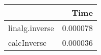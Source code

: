 \begin{tabular}{lr}
\toprule
{} &      Time \\
\midrule
linalg.inverse &  0.000078 \\
calcInverse    &  0.000036 \\
\bottomrule
\end{tabular}
